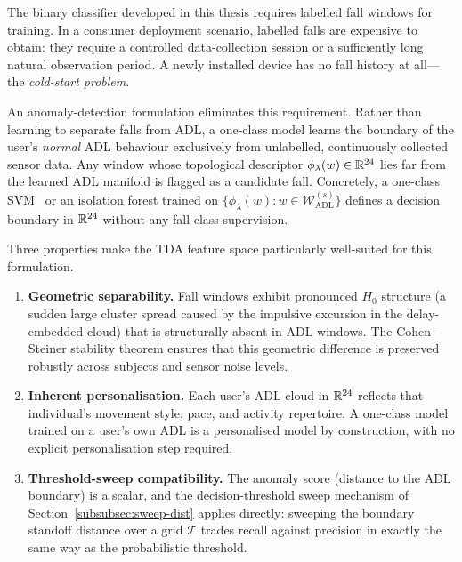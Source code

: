 The binary classifier developed in this thesis requires labelled fall windows for
training.  In a consumer deployment scenario, labelled falls are expensive to obtain:
they require a controlled data-collection session or a sufficiently long natural
observation period.  A newly installed device has no fall history at all---the
\emph{cold-start problem}.

An anomaly-detection formulation eliminates this requirement.  Rather than learning to
separate falls from ADL, a one-class model learns the boundary of the user's
\emph{normal} ADL behaviour exclusively from unlabelled, continuously collected sensor
data.  Any window whose topological descriptor $\phi_\lambda(w)\in\mathbb{R}^{24}$ lies far
from the learned ADL manifold is flagged as a candidate fall.  Concretely, a
one-class SVM~\parencite{scholkopf2001estimating} or an isolation forest trained on
$\{\phi_\lambda(w)\colon w\in\mathcal{W}_{\mathrm{ADL}}^{(s)}\}$ defines a
decision boundary in $\mathbb{R}^{24}$ without any fall-class supervision.

Three properties make the TDA feature space particularly well-suited for this
formulation.

\begin{enumerate}
\item \textbf{Geometric separability.}  Fall windows exhibit pronounced $H_0$
  structure (a sudden large cluster spread caused by the impulsive excursion in the
  delay-embedded cloud) that is structurally absent in ADL windows.  The Cohen--Steiner
  stability theorem ensures that this geometric difference is preserved robustly
  across subjects and sensor noise levels.

\item \textbf{Inherent personalisation.}  Each user's ADL cloud in $\mathbb{R}^{24}$ reflects
  that individual's movement style, pace, and activity repertoire.  A one-class model
  trained on a user's own ADL is a personalised model by construction, with no explicit
  personalisation step required.

\item \textbf{Threshold-sweep compatibility.}  The anomaly score (distance to the ADL
  boundary) is a scalar, and the decision-threshold sweep mechanism of
  Section~\ref{subsubsec:sweep-dist} applies directly: sweeping the boundary standoff
  distance over a grid $\mathcal{T}$ trades recall against precision in exactly the
  same way as the probabilistic threshold.
\end{enumerate}


